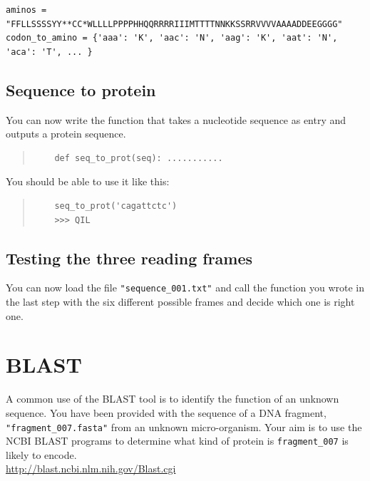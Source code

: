 \documentclass[a4paper,11pt]{article}
\begin{document}
\begin{verbatim}
aminos = "FFLLSSSSYY**CC*WLLLLPPPPHHQQRRRRIIIMTTTTNNKKSSRRVVVVAAAADDEEGGGG"
codon_to_amino = {'aaa': 'K', 'aac': 'N', 'aag': 'K', 'aat': 'N', 'aca': 'T', ... }
\end{verbatim}

\subsection{Sequence to protein}
You can now write the function that takes a nucleotide sequence as entry and outputs a protein sequence.

\begin{quote}
\begin{verbatim}
	def seq_to_prot(seq): ...........
\end{verbatim}
\end{quote}

You should be able to use it like this:
\begin{quote}
\begin{verbatim}
	seq_to_prot('cagattctc')
	>>> QIL
\end{verbatim}
\end{quote}

\subsection{Testing the three reading frames}
You can now load the file \texttt{"sequence\_001.txt"} and call the function you wrote in the last step with the six different possible frames and decide which one is right one.


\section{BLAST}
A common use of the BLAST tool is to identify the function of an unknown sequence. You have been provided with the sequence of a DNA fragment, \texttt{"fragment\_007.fasta"} from an unknown micro-organism. Your aim is to use the NCBI BLAST programs to determine what kind of protein is \texttt{fragment\_007} is likely to encode.\\

\url{http://blast.ncbi.nlm.nih.gov/Blast.cgi}
\end{document}
